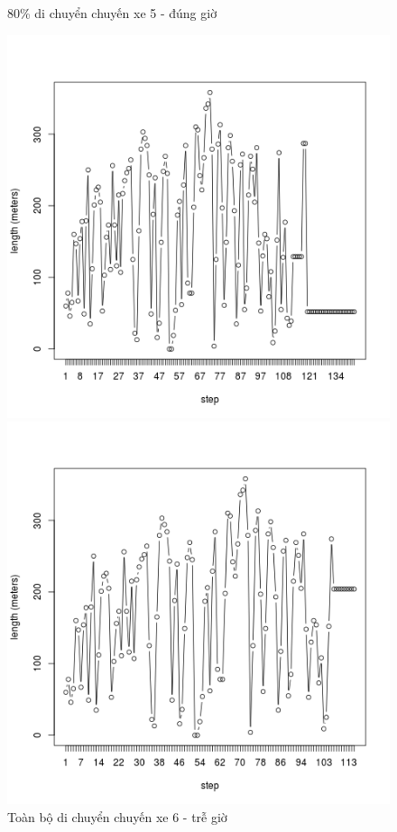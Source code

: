 \documentclass[a4paper, 13pt]{report}
\begin{document}
\begin{figure}[!htb]
  \caption*{80\% di chuyển chuyến xe 5 - đúng giờ}
\endminipage
{}%
  \includegraphics[width=\linewidth]{test_100_6}
  \caption*{Toàn bộ di chuyển chuyến xe 6 - trễ giờ}
\endminipage
{}
  \includegraphics[width=\linewidth]{test_80_6}

\end{figure}
\end{document}
